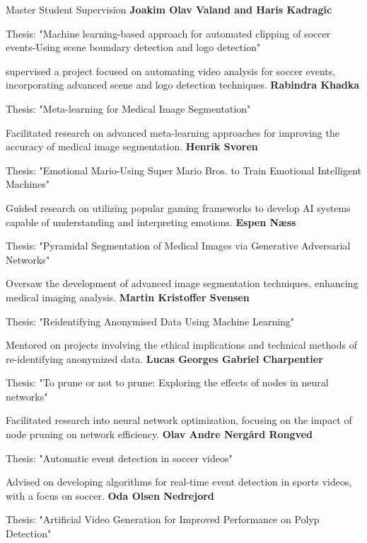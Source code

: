 \begin{rubric}{Master Student Supervision}
    \textbf{Joakim Olav Valand and Haris Kadragic} \par
    Thesis: "Machine learning-based approach for automated clipping of soccer events-Using scene boundary detection and logo detection" \par
    supervised a project focused on automating video analysis for soccer events, incorporating advanced scene and logo detection techniques.
    \entry*[2021]%
    \textbf{Rabindra Khadka} \par
    Thesis: "Meta-learning for Medical Image Segmentation" \par
    Facilitated research on advanced meta-learning approaches for improving the accuracy of medical image segmentation.
    \entry*[2020]%
    \textbf{Henrik Svoren} \par
    Thesis: "Emotional Mario-Using Super Mario Bros. to Train Emotional Intelligent Machines" \par
    Guided research on utilizing popular gaming frameworks to develop AI systems capable of understanding and interpreting emotions.
    \entry*[2020]%
    \textbf{Espen Næss} \par
    Thesis: "Pyramidal Segmentation of Medical Images via Generative Adversarial Networks" \par
    Oversaw the development of advanced image segmentation techniques, enhancing medical imaging analysis.
    \entry*[2020]%
    \textbf{Martin Kristoffer Svensen} \par
    Thesis: "Reidentifying Anonymised Data Using Machine Learning" \par
    Mentored on projects involving the ethical implications and technical methods of re-identifying anonymized data.
    \entry*[2020]%
    \textbf{Lucas Georges Gabriel Charpentier} \par
    Thesis: "To prune or not to prune: Exploring the effects of nodes in neural networks" \par
    Facilitated research into neural network optimization, focusing on the impact of node pruning on network efficiency.
    \entry*[2020]%
    \textbf{Olav Andre Nergård Rongved} \par
    Thesis: "Automatic event detection in soccer videos" \par
    Advised on developing algorithms for real-time event detection in sports videos, with a focus on soccer.
    \entry*[2020]%
    \textbf{Oda Olsen Nedrejord} \par
    Thesis: "Artificial Video Generation for Improved Performance on Polyp Detection" \par

\end{rubric}
